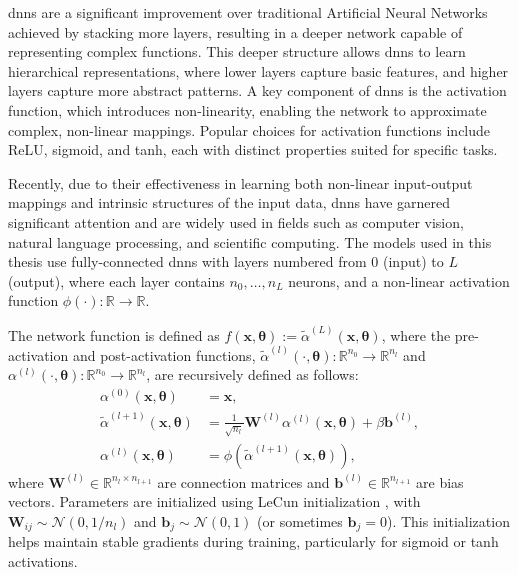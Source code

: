 \acfp{dnn} are a significant improvement over traditional Artificial Neural Networks achieved by stacking more layers, resulting in a deeper network capable of representing complex functions. This deeper structure allows \acp{dnn} to learn hierarchical representations, where lower layers capture basic features, and higher layers capture more abstract patterns. A key component of \acp{dnn} is the activation function, which introduces non-linearity, enabling the network to approximate complex, non-linear mappings. Popular choices for activation functions include ReLU, sigmoid, and tanh, each with distinct properties suited for specific tasks.

Recently, due to their effectiveness in learning both non-linear input-output mappings and intrinsic structures of the input data, \acp{dnn} have garnered significant attention and are widely used in fields such as computer vision, natural language processing, and scientific computing. The models used in this thesis use fully-connected \acp{dnn} with layers numbered from \(0\) (input) to \(L\) (output), where each layer contains \(n_0, \ldots, n_L\) neurons, and a non-linear activation function \( \phi (\cdot) : \mathbb{R} \to \mathbb{R} \). 

The network function is defined as \( f(\mathbf{x}, \boldsymbol{\theta}) := \widetilde{\alpha}^{(L)}(\mathbf{x}, \boldsymbol{\theta}) \), where the pre-activation and post-activation functions, \( \widetilde{\alpha}^{(l)}(\cdot, \boldsymbol{\theta}) : \mathbb{R}^{n_0} \to \mathbb{R}^{n_l} \) and \( \alpha^{(l)}(\cdot, \boldsymbol{\theta}) : \mathbb{R}^{n_0} \to \mathbb{R}^{n_l} \), are recursively defined as follows:
\[
\begin{aligned}
    \alpha^{(0)} (\mathbf{x}, \boldsymbol{\theta}) &= \mathbf{x}, \\
    \widetilde{\alpha}^{(l+1)} (\mathbf{x}, \boldsymbol{\theta}) &= \frac{1}{\sqrt{n_l}} \mathbf{W}^{(l)} \alpha^{(l)}(\mathbf{x}, \boldsymbol{\theta}) + \beta \mathbf{b}^{(l)}, \\
    \alpha^{(l)} (\mathbf{x}, \boldsymbol{\theta}) &= \phi(\widetilde{\alpha}^{(l+1)} (\mathbf{x}, \boldsymbol{\theta})),
\end{aligned}
\]
where \( \mathbf{W}^{(l)} \in \mathbb{R}^{n_l \times n_{l+1}} \) are connection matrices and \( \mathbf{b}^{(l)} \in \mathbb{R}^{n_{l+1}} \) are bias vectors. Parameters are initialized using LeCun initialization \citep{lecun2002efficient}, with \( \mathbf{W}_{ij} \sim \mathcal{N}(0, 1/n_l) \) and \( \mathbf{b}_j \sim \mathcal{N}(0, 1) \) (or sometimes \( \mathbf{b}_j = 0 \)). This initialization helps maintain stable gradients during training, particularly for sigmoid or tanh activations.

